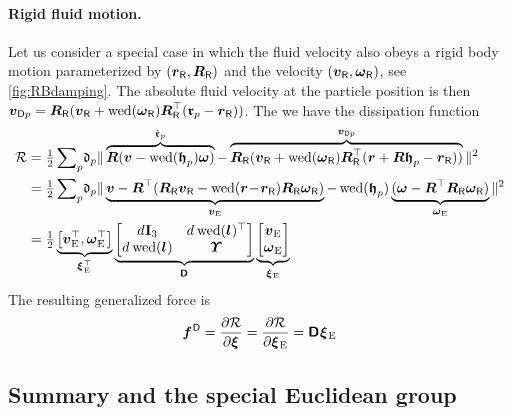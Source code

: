 \paragraph{Rigid fluid motion.}
Let us consider a special case in which the fluid velocity also obeys a rigid body motion parameterized by $(\boldsymbol{r}_{\mathsf{R}},\boldsymbol{R}_{\mathsf{R}})$ and the velocity $(\boldsymbol{v}_{\mathsf{R}},\boldsymbol{\omega}_{\mathsf{R}})$, see \autoref{fig:RBdamping}.
The absolute fluid velocity at the particle position is then $\boldsymbol{v}_{\mathsf{D}p} = \boldsymbol{R}_{\mathsf{R}}(\boldsymbol{v}_{\mathsf{R}} + \operatorname{wed}(\boldsymbol{\omega}_{\mathsf{R}})\boldsymbol{R}_{\mathsf{R}}^\top(\boldsymbol{\mathfrak{r}}_{p} - \boldsymbol{r}_{\mathsf{R}}))$.
The we have the dissipation function
\begin{align}\label{eq:RBDissFkt}
 \dissFkt &= \tfrac{1}{2} \sumParticles \!\particleDamping{\PidxI} \norm{\overbrace{\R(\v - \wedOp(\particleBodyPos{\PidxI})\w)}^{\particlePosd{\PidxI}} - \overbrace{\RR(\vR + \wedOp(\wR)\RR^\top(\r + \R\particleBodyPos{\PidxI} - \rR))}^{\tuple{v}_{\mathsf{D}\PidxI}}}^2
\nonumber\\
 &= \tfrac{1}{2} \sumParticles \!\particleDamping{\PidxI} \norm{\underbrace{\v - \R^\top(\RR\vR - \wedOp(\r \!-\! \rR)\RR\wR)}_{\vE} - \wedOp(\particleBodyPos{\PidxI})\underbrace{(\w - \R^\top\RR\wR)}_{\wE}}^2
\nonumber\\
 &= \tfrac{1}{2} 
 \underbrace{\big[ \vE^\top, \wE^\top \big]}_{\bodyVelE{}{}^\top }
 \underbrace{\begin{bmatrix} \bodyDamping{}{}\idMat[3] & \bodyDamping{}{} \wedOp(\bodyCOD{}{})^\top \\ \bodyDamping{}{} \wedOp(\bodyCOD{}{}) & \bodyMOD{}{} \end{bmatrix}}_{\bodyDissMat{}{}}
 \underbrace{\begin{bmatrix} \vE \\ \wE \end{bmatrix}}_{\bodyVelE{}{}}
\end{align}
The resulting generalized force is 
\begin{align}
 \bodyGenForceDiss{}{} = \pdiff[\dissFkt]{\bodyVel{}{}} = \pdiff[\dissFkt]{\bodyVelE{}{}} = \bodyDissMat{}{} \bodyVelE{}{}
\end{align}


\subsection{Summary and the special Euclidean group}\label{sec:RBSummary}

